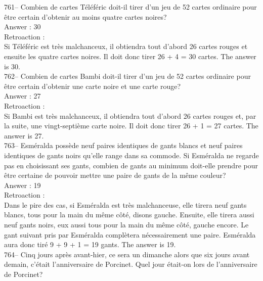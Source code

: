 ﻿\documentclass[letterpaper, 12pt]{article}
\begin{document}
761-- Combien de cartes T\'el\'ef\'eric doit-il tirer d'un jeu de 52 cartes
ordinaire pour \^etre certain d'obtenir au moins quatre cartes noires?\\

Answer : 30\\

Retroaction : \\
Si T\'el\'ef\'eric est tr\`es malchanceux, il obtiendra tout d'abord 26
cartes rouges et ensuite les quatre cartes noires.  Il doit donc tirer 26 +
4 = 30 cartes.  The answer is 30.\\

762-- Combien de cartes Bambi doit-il tirer d'un jeu de 52 cartes ordinaire
pour \^etre certain d'obtenir une carte noire et une carte rouge?\\

Answer : 27\\

Retroaction : \\
Si Bambi est tr\`es malchanceux, il obtiendra tout d'abord 26 cartes rouges
et, par la suite, une vingt-septi\`eme carte noire.  Il doit donc tirer 26 +
1 = 27 cartes. The answer is 27.\\

763-- Esm\'eralda poss\`ede neuf paires identiques de gants blancs et neuf
paires identiques de gants noirs qu'elle range dans sa commode.  Si
Esm\'eralda ne regarde pas en choisissant ses gants, combien de gants au
minimum doit-elle prendre pour \^etre certaine de pouvoir mettre une paire
de gants de la m\^eme couleur?\\

Answer : 19\\

Retroaction : \\
Dans le pire des cas, si Esm\'eralda est tr\`es malchanceuse, elle tirera
neuf gants blancs, tous pour la main du m\^eme c\^ot\'e, disons gauche.
Ensuite, elle tirera aussi neuf gants noirs, eux aussi tous pour la main du
m\^eme c\^ot\'e, gauche encore. Le gant suivant pris par Esm\'eralda
compl\`etera n\'ecessairement une paire. Esm\'eralda aura donc tir\'e 9 + 9
+ 1 = 19 gants.  The answer is 19.\\

764-- Cinq jours apr\`es avant-hier, ce sera un dimanche alors que six jours
avant demain, c'\'etait l'anniversaire de Porcinet.  Quel jour \'etait-on
lors de l'anniversaire de Porcinet?\\
\end{document}
